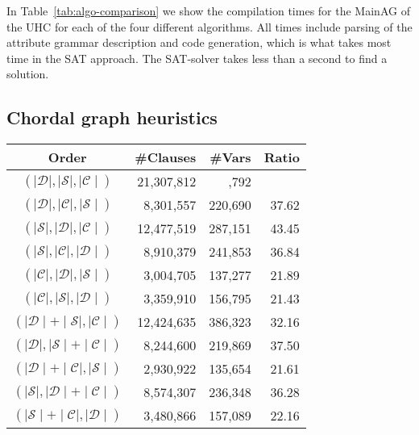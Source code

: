 \documentclass{llncs}
\newcommand{\tabref}[1]{Table~\ref{#1}}
\begin{document}
In \tabref{tab:algo-comparison} we show the compilation times for the MainAG of the UHC for each of the four different algorithms. All times include parsing of the attribute grammar description and code generation, which is what takes most time in the SAT approach. The SAT-solver takes less than a second to find a solution.

\subsection{Chordal graph heuristics} \label{sect:heuristics}
\begin{table}
  \begin{center}
    \begin{tabular}{c r r r }
      Order                                   &   \#Clauses   & \#Vars       & Ratio \\
      \hline
      $(\mid\mathcal{D}\mid,\mid\mathcal{S}\mid,\mid\mathcal{C}\mid)$ &  21,307,812  & \quad 374,792           & \quad 57.85 \\
      $(\mid\mathcal{D}\mid,\mid\mathcal{C}\mid,\mid\mathcal{S}\mid)$ &   8,301,557   & 220,690           & 37.62 \\
      $(\mid\mathcal{S}\mid,\mid\mathcal{D}\mid,\mid\mathcal{C}\mid)$ &  12,477,519   & 287,151           & 43.45 \\
      $(\mid\mathcal{S}\mid,\mid\mathcal{C}\mid,\mid\mathcal{D}\mid)$ &   8,910,379   & 241,853           & 36.84 \\
      $(\mid\mathcal{C}\mid,\mid\mathcal{D}\mid,\mid\mathcal{S}\mid)$ &   3,004,705   & 137,277           & 21.89 \\
      $(\mid\mathcal{C}\mid,\mid\mathcal{S}\mid,\mid\mathcal{D}\mid)$ &   3,359,910   & 156,795           & 21.43 \\
      $(\mid\mathcal{D}\mid+\mid\mathcal{S}\mid,\mid\mathcal{C}\mid)$     &  12,424,635   & 386,323           & 32.16 \\
      $(\mid\mathcal{D}\mid,\mid\mathcal{S}\mid+\mid\mathcal{C}\mid)$     &   8,244,600   & 219,869           & 37.50 \\
      $(\mid\mathcal{D}\mid+\mid\mathcal{C}\mid,\mid\mathcal{S}\mid)$     &   2,930,922   & 135,654           & 21.61 \\
      $(\mid\mathcal{S}\mid,\mid\mathcal{D}\mid+\mid\mathcal{C}\mid)$     &   8,574,307   & 236,348           & 36.28 \\
      $(\mid\mathcal{S}\mid+\mid\mathcal{C}\mid,\mid\mathcal{D}\mid)$     &   3,480,866   & 157,089           & 22.16 \\

\end{tabular}
\end{center}
\end{table}
\end{document}
